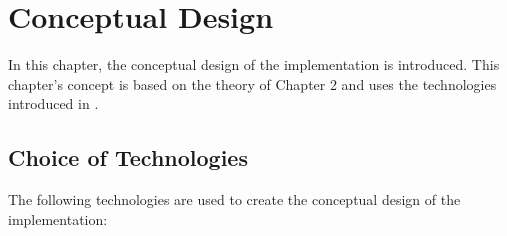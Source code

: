 \chapter{Conceptual Design}
\label{chap:05_design}

In this chapter, the conceptual design of the implementation is introduced. This chapter's concept is based on the theory of Chapter 2 and uses the technologies introduced in .


\section{Choice of Technologies}
\label{sec:05_restrictions}
The following technologies are used to create the conceptual design of the implementation:

